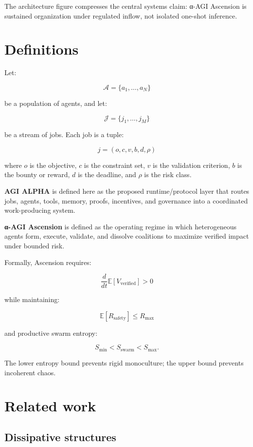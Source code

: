 \documentclass[
  11pt,
]{article}
\begin{document}
The architecture figure compresses the central systems claim: α-AGI
Ascension is sustained organization under regulated inflow, not isolated
one-shot inference.

\section{Definitions}\label{definitions}

Let:

\[
\mathcal{A}=\{a_1,\ldots,a_N\}
\]

be a population of agents, and let:

\[
\mathcal{J}=\{j_1,\ldots,j_M\}
\]

be a stream of jobs. Each job is a tuple:

\[
j=(o,c,v,b,d,\rho)
\]

where \(o\) is the objective, \(c\) is the constraint set, \(v\) is the
validation criterion, \(b\) is the bounty or reward, \(d\) is the
deadline, and \(\rho\) is the risk class.

\textbf{AGI ALPHA} is defined here as the proposed runtime/protocol
layer that routes jobs, agents, tools, memory, proofs, incentives, and
governance into a coordinated work-producing system.

\textbf{α-AGI Ascension} is defined as the operating regime in which
heterogeneous agents form, execute, validate, and dissolve coalitions to
maximize verified impact under bounded risk.

Formally, Ascension requires:

\[
\frac{d}{dt}\mathbb{E}[V_{\text{verified}}] > 0
\]

while maintaining:

\[
\mathbb{E}[R_{\text{safety}}] \leq R_{\max}
\]

and productive swarm entropy:

\[
S_{\min}<S_{\text{swarm}}<S_{\max}.
\]

The lower entropy bound prevents rigid monoculture; the upper bound
prevents incoherent chaos.

\section{Related work}\label{related-work}

\subsection{Dissipative structures}\label{dissipative-structures}
\end{document}
